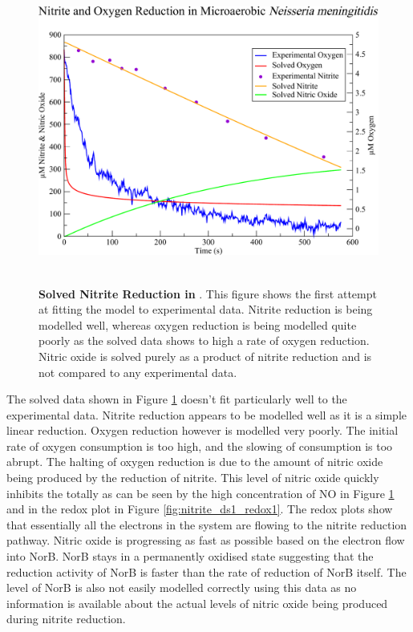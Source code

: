 \begin{figure}[tbp]
 \centering
 \includegraphics[height=10cm, clip=true]{./07-nitritereduction/data/dataset1-1.pdf}
 \caption[Solved Nitrite Reduction in \Nsm{}]{{\bf Solved Nitrite Reduction in \Nsm{}}. This figure shows the first attempt at fitting the model to experimental data. Nitrite reduction is being modelled well, whereas oxygen reduction is being modelled quite poorly as the solved data shows to high a rate of oxygen reduction. Nitric oxide is solved purely as a product of nitrite reduction and is not compared to any experimental data.
  \label{fig:nitrite_ds1_solved1}}
\end{figure}

The solved data shown in Figure \ref{fig:nitrite_ds1_solved1} doesn't fit particularly well to the experimental data. Nitrite reduction appears to be modelled well as it is a simple linear reduction. Oxygen reduction however is modelled very poorly. The initial rate of oxygen consumption is too high, and the slowing of consumption is too abrupt. The halting of oxygen reduction is due to the amount of nitric oxide being produced by the reduction of nitrite. This level of nitric oxide quickly inhibits the \cbbthree{} totally as can be seen by the high concentration of NO in Figure \ref{fig:nitrite_ds1_solved1} and in the redox plot in Figure \ref{fig:nitrite_ds1_redox1}. The redox plots show that essentially all the electrons in the system are flowing to the nitrite reduction pathway. Nitric oxide is progressing as fast as possible based on the electron flow into NorB. NorB stays in a permanently oxidised state suggesting that the reduction activity of NorB is faster than the rate of reduction of NorB
itself. The level of NorB is also not easily modelled correctly using this data as no information is available about the actual levels of nitric oxide being produced during nitrite reduction.

